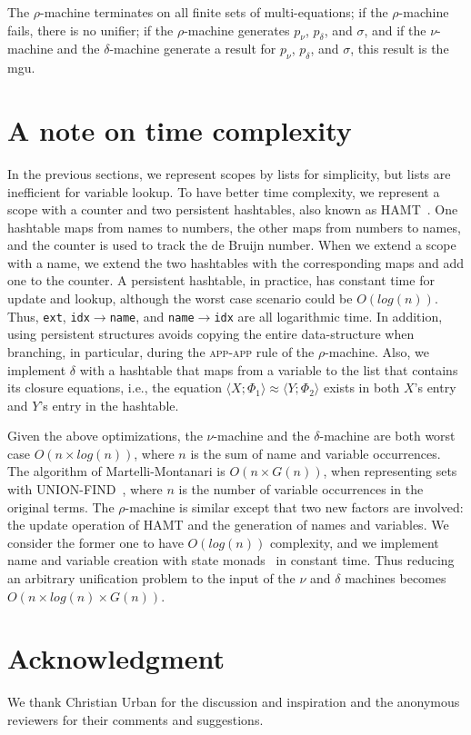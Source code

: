 \documentclass[a4paper,UKenglish]{lipics-v2016}
\newcommand{\clos}[2] {
  \langle #1; #2 \rangle
}
\newcommand{\aeq}[4] {
  \clos{#1}{#2} \approx \clos{#3}{#4}
}
\newcommand*{\transname}[1]{\textsc{#1}}
\begin{document}
\begin{conjecture}\label{lemma:rmachine}
  The $\rho$-machine terminates on all finite sets of multi-equations;
  if the $\rho$-machine fails, there is no unifier;
  if the $\rho$-machine generates $p_\nu$, $p_\delta$, and $\sigma$,
  and if the $\nu$-machine and the $\delta$-machine generate a result for
  $p_\nu$, $p_\delta$, and $\sigma$, this result is the mgu.
  \end{conjecture}

\section{A note on time complexity}
    \label{efficiency}

In the previous sections, we represent scopes by lists for simplicity,
but lists are inefficient for variable lookup.  To have better time
complexity, we represent a scope with a counter and two persistent
hashtables, also known as HAMT~\citep{bagwell_ideal_2001}.  One
hashtable maps from names to numbers, the other maps from numbers to
names, and the counter is used to track the de Bruijn number.  When we
extend a scope with a name, we extend the two hashtables with the
corresponding maps and add one to the counter.  A persistent
hashtable, in practice, has constant time for update and lookup,
although the worst case scenario could be $O(log(n))$.  Thus,
\texttt{ext}, \texttt{idx$\rightarrow$name}, and
\texttt{name$\rightarrow$idx} are all logarithmic time.  In addition,
using persistent structures avoids copying the entire data-structure
when branching, in particular, during the \transname{app-app} rule of
the $\rho$-machine.
Also, we implement $\delta$ with a hashtable that maps from a variable to
the list that contains its closure equations,
i.e., the equation $\aeq{X}{\Phi_1}{Y}{\Phi_2}$
exists in both $X$'s entry and $Y$'s entry in the hashtable.

Given the above optimizations, the $\nu$-machine and the
$\delta$-machine are both worst case $O(n \times log(n))$,
where $n$ is the sum of name and variable occurrences.
The algorithm of Martelli-Montanari is $O(n \times G(n))$, when
representing sets with UNION-FIND~\citep{tarjan_efficiency_1975}, where
$n$ is the number of variable occurrences in the original terms.  The
$\rho$-machine is similar except that two new factors are involved:
the update operation of HAMT and the generation of names and
variables.  We consider the former one to have $O(log(n))$ complexity,
and we implement name and variable creation with state
monads~\citep{moggi_notions_1991} in
constant time.  Thus reducing an arbitrary unification problem to the
input of the $\nu$ and $\delta$ machines becomes $O(n \times log(n) \times
G(n))$.

\section*{Acknowledgment}
We thank Christian Urban for the discussion and inspiration
and the anonymous reviewers for their comments and suggestions.


\end{document}
